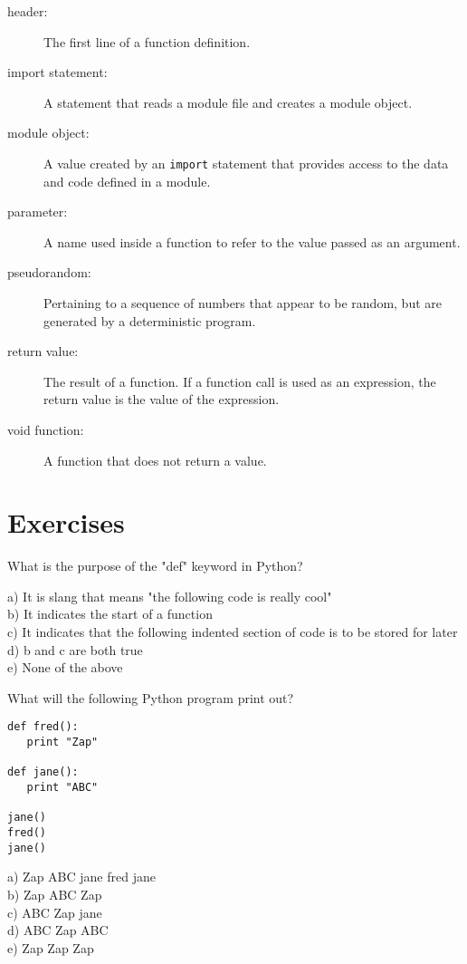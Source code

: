 \begin{description}
\item[header:] The first line of a function definition.

\item[import statement:] A statement that reads a module file and creates
a module object.

\item[module object:] A value created by an {\tt import} statement
that provides access to the data and code defined in a module.

\item[parameter:] A name used inside a function to refer to the value
passed as an argument.

\item[pseudorandom:] Pertaining to a sequence of numbers that appear
to be random, but are generated by a deterministic program.

\item[return value:]  The result of a function.  If a function call
is used as an expression, the return value is the value of
the expression.

\item[void function:] A function that does not return a value.


\end{description}


\section{Exercises}

\begin{ex}
What is the purpose of the "def" keyword in Python?

a) It is slang that means "the following code is really cool"\\
b) It indicates the start of a function\\
c) It indicates that the following indented section of code is to be stored for later\\
d) b and c are both true\\
e) None of the above
\end{ex}

\begin{ex}
What will the following Python program print out?

\beforeverb
\begin{verbatim}
def fred():
   print "Zap"

def jane():
   print "ABC"

jane()
fred()
jane()
\end{verbatim}
\afterverb
%
a) Zap ABC jane fred jane\\
b) Zap ABC Zap\\
c) ABC Zap jane\\
d) ABC Zap ABC\\
e) Zap Zap Zap
\end{ex}

